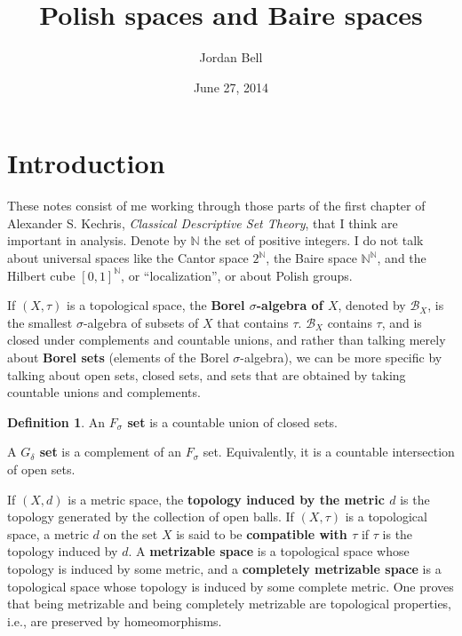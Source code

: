 \documentclass{article}
\theoremstyle{definition}
\theoremstyle{definition}
\newtheorem{definition}[theorem]{Definition}
\begin{document}
\title{Polish spaces and Baire spaces}
\author{Jordan Bell}
\date{June 27, 2014}

\maketitle


\section{Introduction}
These notes consist of me working through those parts of the first chapter of Alexander S. Kechris, {\em Classical Descriptive Set Theory}, 
that I think are important in analysis. Denote by  $\mathbb{N}$ the set of positive integers.
I do not talk about universal spaces like the Cantor space $2^\mathbb{N}$, the Baire space $\mathbb{N}^\mathbb{N}$, and the
Hilbert cube $[0,1]^\mathbb{N}$, or ``localization'', or about Polish groups. 

If $(X,\tau)$ is a topological space, the \textbf{Borel $\sigma$-algebra of $X$},
denoted by $\mathscr{B}_X$, is the smallest $\sigma$-algebra of subsets of $X$ that contains $\tau$. 
$\mathscr{B}_X$ contains $\tau$, and is closed under complements and countable unions, and rather than talking merely about \textbf{Borel sets} (elements of the Borel $\sigma$-algebra),
we can be more specific by talking about open sets, closed sets, and sets that are obtained by taking countable unions and complements. 

\begin{definition}
An \textbf{$F_\sigma$ set}
is a countable union of closed sets.

A \textbf{$G_\delta$ set} is a complement of an $F_\sigma$ set. Equivalently, it is a countable intersection of open sets.
\end{definition}

If $(X,d)$ is a metric space, the \textbf{topology induced by the metric $d$} is the topology generated by the collection of open balls. 
If $(X,\tau)$ is a topological space, a metric $d$ on the set $X$ is said to be \textbf{compatible with $\tau$} if $\tau$ is the topology induced by $d$. A \textbf{metrizable
space} is a topological space whose topology is induced by some metric, and   a \textbf{completely metrizable space} is a topological space whose topology is induced by some
complete metric. One proves that being metrizable  and being completely metrizable are topological properties, i.e., are preserved by homeomorphisms.
\end{document}
